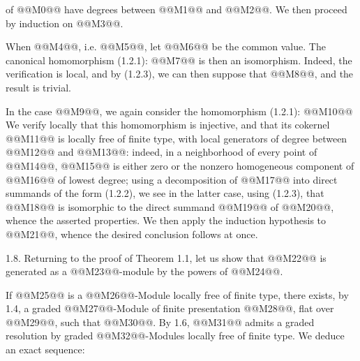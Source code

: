 of @@M0@@ have degrees between @@M1@@ and @@M2@@. We then proceed by induction on @@M3@@.

When @@M4@@, i.e. @@M5@@, let @@M6@@ be the common value. The canonical homomorphism (1.2.1):
@@M7@@
is then an isomorphism. Indeed, the verification is local, and by (1.2.3), we can then suppose that @@M8@@, and the result is trivial.

In the case @@M9@@, we again consider the homomorphism (1.2.1):
@@M10@@
We verify locally that this homomorphism is injective, and that its cokernel @@M11@@ is locally free of finite type, with local generators of degree between @@M12@@ and @@M13@@: indeed, in a neighborhood of every point of @@M14@@, @@M15@@ is either zero or the nonzero homogeneous component of @@M16@@ of lowest degree; using a decomposition of @@M17@@ into direct summands of the form (1.2.2), we see in the latter case, using (1.2.3), that @@M18@@ is isomorphic to the direct summand @@M19@@ of @@M20@@, whence the asserted properties. We then apply the induction hypothesis to @@M21@@, whence the desired conclusion follows at once.

1.8. Returning to the proof of Theorem 1.1, let us show that @@M22@@ is generated as a @@M23@@-module by the powers of @@M24@@.

If @@M25@@ is a @@M26@@-Module locally free of finite type, there exists, by 1.4, a graded @@M27@@-Module of finite presentation @@M28@@, flat over @@M29@@, such that @@M30@@. By 1.6, @@M31@@ admits a graded resolution by graded @@M32@@-Modules locally free of finite type. We deduce an exact sequence:
